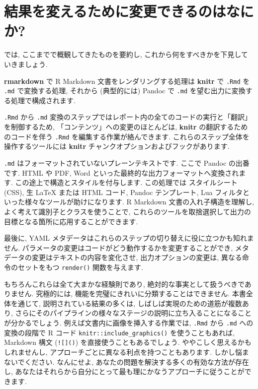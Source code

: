 \documentclass[
  11pt,
]{bxjsreport}
\begin{document}
\hypertarget{what-to-change}{%
\section{結果を変えるために変更できるのはなにか?}\label{what-to-change}}

では, ここまでで概観してきたものを要約し, これから何をすべきかを下見していきましょう.

\textbf{rmarkdown} で R Markdown 文書をレンダリングする処理は \textbf{knitr} で \texttt{.Rmd} を \texttt{.md} で変換する処理, それから (典型的には) Pandoc で \texttt{.md} を望む出力に変換する処理で構成されます.

\texttt{.Rmd} から \texttt{.md} 変換のステップではレポート内の全てのコードの実行と「翻訳」を制御するため, 「コンテンツ」への変更のほとんどは, \textbf{knitr} の翻訳するためのコードを伴う \texttt{.Rmd} を編集する作業が絡んできます. これらのステップ全体を操作するツールには \textbf{knitr} チャンクオプションおよびフックがあります.

\texttt{.md} はフォーマットされていないプレーンテキストです. ここで Pandoc の出番です. HTML や PDF, Word といった最終的な出力フォーマットへ変換されます. この途上で構造とスタイルを付与します. この処理では スタイルシート (CSS), 生 LaTeX または HTML コード, Pandoc テンプレート, Lua フィルタといった様々なツールが助けになります. R Markdown 文書の入れ子構造を理解し, よく考えて識別子とクラスを使うことで, これらのツールを取捨選択して出力の目標となる箇所に応用することができます.

最後に, YAML メタデータはこれらのステップの切り替えに役に立つかも知れません. パラメータの変更はコードがどう動作するかを変更することができ, メタデータの変更はテキストの内容を変化させ, 出力オプションの変更は, 異なる命令のセットをもつ \texttt{render()} 関数を与えます.

もちろんこれらは全て大まかな経験則であり, 絶対的な事実として扱うべきでありません. 究極的には, 機能を完璧にきれいに分類することはできません. 本書全体を通じて, 説明されている結果の多くは, しばしば実現のための道筋が複数あり, さらにそのパイプラインの様々なステージの説明に立ち入ることになることが分かるでしょう. 例えば文書内に画像を挿入する作業では, \texttt{.Rmd} から \texttt{.md} への変換の段階で R コード \texttt{knitr::include\_graphics()} を使うこともあれば, Markdown 構文 (\texttt{!{[}{]}()}) を直接使うこともあるでしょう. ややこしく思えるかもしれませんし, アプローチごとに異なる利点を持つこともあります. しかし悩まないでください. なんにせよ, あなたの問題を解決する多くの有効な方法が存在し, あなたはそれらから自分にとって最も理にかなうアプローチに従うことができます.
\end{document}
